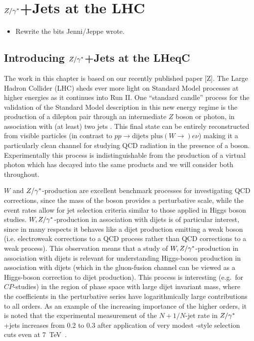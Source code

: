 \chapter{$Z/\gamma^*$+Jets at the LHC}
\label{chap:Zs}

{\color{red}
\begin{itemize}
	\item Rewrite the bits Jenni/Jeppe wrote.
\end{itemize}
}

\section{Introducing $Z/\gamma^*$+Jets at the LHeqC}

	The work in this chapter is based on our recently published paper [Z].
	The Large Hadron Collider (LHC)
	sheds ever more light on Standard Model processes at higher energies as it
	continues into Run II.  One ``standard candle'' process for the validation of
	the Standard Model description in this new energy regime is the production of
	a dilepton pair through an intermediate $Z$ boson or photon, in
	association with (at least) two jets \cite{Chatrchyan:2011ne, Aad:2011qv,
	Chatrchyan:2013tna, Aad:2013ysa, Khachatryan:2014zya, Aad:2014rta,
	Khachatryan:2014dea}.  This final state can be entirely reconstructed from
	visible particles (in contrast to $pp\to \text{dijets plus}(W\to) e\nu$) making it a particularly
	clean channel for studying QCD radiation in the presence of a boson.
	Experimentally this process is indistinguishable from the production of a
	virtual photon which has decayed into the same products and we will consider
	both throughout.

	$W$ and $Z/\gamma^*$-production are excellent benchmark processes for investigating
	QCD corrections, since the mass of the boson provides a perturbative scale,
	while the event rates allow for jet selection criteria similar to those
	applied in Higgs boson studies. $W,Z/\gamma^*$-production in association with dijets
	is of particular interest, since in many respects it behaves like a dijet
	production emitting a weak boson (i.e. electroweak corrections to a QCD
	process rather than QCD corrections to a weak process). This observation
	means that a study of $W,Z/\gamma^*$-production in association with dijets is
	relevant for understanding Higgs-boson production in association with dijets
	(which in the gluon-fusion channel can be viewed as a Higgs-boson correction
	to dijet production). This process is interesting (e.g.~for $CP$-studies) in
	the region of phase space with large dijet invariant mass, where the
	coefficients in the perturbative series have logarithmically large
	contributions to all orders. As an example of the increasing importance of
	the higher orders, it is noted that the experimental measurement of the
	$N+1/N$-jet rate in $Z/\gamma^*$+jets increases from 0.2 to 0.3 after application of
	very modest \wbf-style selection cuts even at 7~TeV~\cite{Chatrchyan:2011ne,Aad:2011qv,Aad:2013ysa}.

